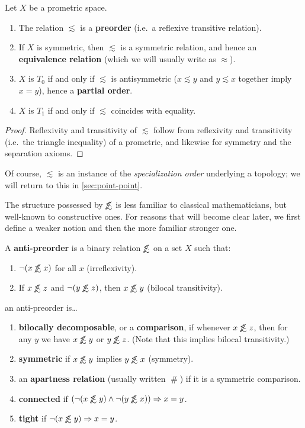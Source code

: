 \documentclass{article}
\def\apart{\mathrel{\#}}
\def\oapt{\mathrel{\!\not\,\not\lesssim}}
\def\leapx{\lesssim}
\let\implies\Rightarrow
\begin{document}
\begin{thm}\label{thm:pmet-preord}
  Let $X$ be a prometric space.
  \begin{enumerate}
  \item The relation $\leapx$ is a \textbf{preorder} (i.e.\ a reflexive transitive relation).
  \item If $X$ is symmetric, then $\leapx$ is a symmetric relation, and hence an \textbf{equivalence relation} (which we will usually write as $\approx$).
  \item $X$ is $T_0$ if and only if $\leapx$ is antisymmetric ($x\leapx y$ and $y\leapx x$ together imply $x=y$), hence a \textbf{partial order}.
  \item $X$ is $T_1$ if and only if $\leapx$ coincides with equality.
  \end{enumerate}
\end{thm}
\begin{proof}
  Reflexivity and transitivity of $\leapx$ follow from reflexivity and transitivity (i.e.\ the triangle inequality) of a prometric, and likewise for symmetry and the separation axioms.
\end{proof}

Of course, $\leapx$ is an instance of the \emph{specialization order} underlying a topology; we will return to this in \cref{sec:point-point}.

The structure possessed by $\oapt$ is less familiar to classical mathematicians, but well-known to constructive ones.  
For reasons that will become clear later, we first define a weaker notion and then the more familiar stronger one.

\begin{defn}\label{def:anti-preorder}
  A \textbf{anti-preorder} is a binary relation $\oapt$ on a set $X$ such that:
  \begin{enumerate}
  \item $\neg(x\oapt x)$ for all $x$ (irreflexivity).
  \item If $x\oapt z$ and $\neg(y\oapt z)$, then $x\oapt y$ (bilocal transitivity).
  \end{enumerate}
  an anti-preorder is\dots
  \begin{enumerate}[resume]
  \item \textbf{bilocally decomposable}, or a \textbf{comparison}, if whenever $x\oapt z$, then for any $y$ we have $x\oapt y$ or $y\oapt z$.
    (Note that this implies bilocal transitivity.)
  \item \textbf{symmetric} if $x\oapt y$ implies $y\oapt x$ (symmetry).
  \item an \textbf{apartness relation} (usually written $\apart$) if it is a symmetric comparison.
  \item \textbf{connected} if $(\neg(x\oapt y)\land \neg(y\oapt x))\implies x=y$.
  \item \textbf{tight} if $\neg(x\oapt y) \implies x=y$.
  \end{enumerate}
\end{defn}
\end{document}
